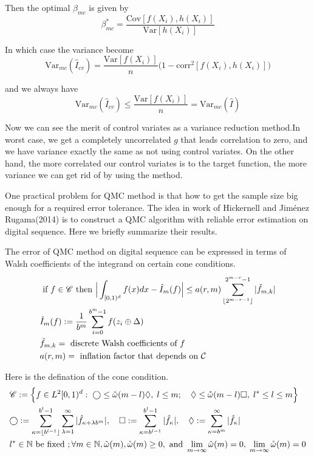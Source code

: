 Then the optimal $\beta_{mc}$ is given by 
\begin{equation}
    \beta_{mc}^*=\frac{\mathrm{Cov}[f(X_i),h(X_i)]}{\mathrm{Var}[h(X_i)]}
    \label{eq:optBeta}
\end{equation}

In which case the variance become
\[
    \mathrm{Var}_{mc}(\hat{I}_{cv})= \frac{\mathrm{Var}[f(X_i)]}{n}\big(1-\mathrm{corr}^2[f(X_i), h(X_i)]\big) 
\]

and we always have 
\[
\mathrm{Var}_{mc}(\hat{I}_{cv}) \leq \frac{\mathrm{Var}[f(X_i)]}{n}=\mathrm{Var}_{mc}(\hat{I})
\]

Now we can see the merit of control variates as a variance reduction method.In worst case, we get a completely uncorrelated $g$ that leads correlation to zero, and we have variance exactly the same as not using control variates. On the other hand, the more correlated our control variates is to the target function, the more variance we can get rid of by using the method.



One practical problem for QMC method is that how to get the sample size big enough for a required error tolerance. The idea in work of Hickernell and Jiménez Rugama(2014)\cite{hickernell2014reliable} is to construct a QMC algorithm with reliable error estimation on digital sequence. Here we briefly summarize their results.

The error of QMC method on digital sequence can be expressed in terms of Walsh coefficients of the integrand on certain cone conditions. 
\begin{align}
    \label{eq:errBound}
    &\text{ if } f \in \mathscr{C}\text{ then } \Big|\int_{[0,1)^d}f(x)dx - \hat{I}_m(f)\Big| \leq a(r,m) \sum_{\lfloor 2^{m-r-1} \rfloor}^{2^{m-r}-1} |\tilde{f}_{m,k}|\\
    &\hat{I}_m(f): = \frac{1}{b^m}\sum_{i=0}^{b^m-1}f(z_i\oplus \Delta)\notag\\
    &\tilde{f}_{m,k}=\text{ discrete Walsh coefficients of }f \notag\\
    &a(r,m) =\text{ inflation factor that depends on } \mathcal{C} \notag
\end{align}

Here is the defination of the cone condition.
\begin{align}
   &\mathscr{C}:=\Big\{f\in L^2[0,1)^d:\;\bigcirc \leq \hat{\omega}(m-l)\Diamond,\; l\leq m;\quad
   \Diamond \leq \mathring{\omega}(m-l) \Box, 
   \; l^*\leq l \leq m\Big\}\notag\\
   \label{eq:cone}
   &\bigcirc:= \sum_{\kappa=\lfloor b^{l-1} \rfloor}^{b^l-1} \sum_{\lambda=1}^{\infty}| \hat{f}_{\kappa+\lambda b^m}|,\quad  
   \Box:= \sum_{\kappa=b^{l-1}}^{b^l-1}|\hat{f}_\kappa|,\quad
   \Diamond:=\sum_{\kappa=b^m}^{\infty}|\hat{f}_{\kappa}|\\
   &l^*\in \mathbb{N}\text{ be fixed }; \forall m\in \mathbb{N},\hat{\omega}(m),\mathring{\omega}(m)\geq 0, \text{ and } \lim_{m\to \infty} \hat{\omega}(m)=0,\; \lim_{m\to \infty} \mathring{\omega}(m)=0\notag
\end{align}

